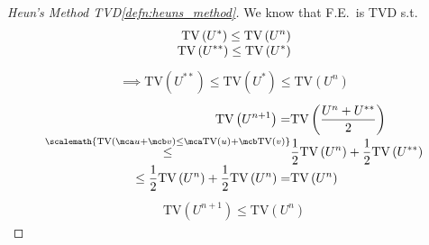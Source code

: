 \begin{proofbox}\nospacing
    \begin{proof}[Heun's Method TVD\cref{defn:heuns_method}]\label{proof:defn:heuns_method_tvd}
          We know that F.E.\ is TVD s.t.\
          \begin{align*}
            \text{TV}\left(U^{*}\right)\leq\text{TV}\left(U^{n}\right)\\[-1\jot]
            \text{TV}\left(U^{**}\right)\leq\text{TV}\left(U^{*}\right)
          \end{align*}
          \begin{align*}
            \implies\text{TV}\left(U^{**}\right)\leq\text{TV}\left(U^{*}\right)\leq\text{TV}\left(U^{n}\right)
          \end{align*}
          \begin{align*}
            \text{TV}\left(U^{n+1}\right)=&\text{TV}\left(\frac{U^{n}+U^{**}}{2}\right)\\[-1\jot]
            \vspace{-2em}\stackrel{\scalemath{\text{TV}(\mca u+\mcb v)\leq\mca \text{TV}(u)+\mcb \text{TV}(v)}}{\leq}&\frac{1}{2}\text{TV}\left(U^{n}\right)+\frac{1}{2}\text{TV}\left(U^{**}\right)\\[-1\jot]
            \leq\frac{1}{2}\text{TV}\left(U^{n}\right)+\frac{1}{2}\text{TV}\left(U^{n}\right)=&\text{TV}\left(U^{n}\right)
          \end{align*}
          \begin{align*}
            \text{TV}\left(U^{n+1}\right)\leq\text{TV}\left(U^{n}\right)
          \end{align*}
    \end{proof}
\end{proofbox}
